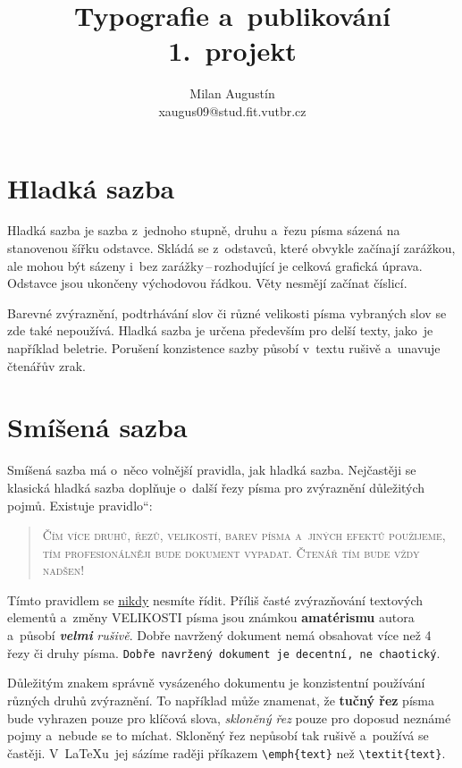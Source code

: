 \documentclass[a4paper, 11pt, twocolumn]{article}
\title{Typografie a~publikování\\1.~projekt}
\author{Milan Augustín\\
xaugus09@stud.fit.vutbr.cz}
\date{}
\newcommand{\myuv}[1]{\quotedblbase #1\textquotedblleft}
\begin{document}
\maketitle
\section{Hladká sazba}
Hladká sazba je sazba z~jednoho stupně, druhu a~řezu písma sázená na stanovenou šířku odstavce. Skládá se z~odstavců, které obvykle začínají zarážkou, ale mohou být sázeny i~bez zarážky\,--\,rozhodující je celková grafická úprava. Odstavce jsou ukončeny východovou řádkou. Věty nesmějí začínat číslicí.

Barevné zvýraznění, podtrhávání slov či různé velikosti písma vybraných slov se zde také nepoužívá. Hladká sazba je určena především pro delší texty, jako~je například beletrie. Porušení konzistence sazby pů\-so\-bí v~textu rušivě a~unavuje čtenářův zrak.

\section{Smíšená sazba}
Smíšená sazba má o~něco volnější pravidla, jak hladká sazba. Nejčastěji se klasická hladká sazba doplňuje o~další řezy písma pro zvýraznění důležitých pojmů. Existuje \myuv{pravidlo}:

\begin{quotation}
\textsc{Čím více druhů, řezů, velikostí, barev písma a~jiných efektů po\-u\-ži\-je\-me, tím profesionálněji bude do\-ku\-ment vypadat. Čtenář tím bude vždy nadšen!}
\end{quotation}

Tímto pravidlem se \underline{nikdy} nesmíte řídit. Příliš časté zvýrazňování textových elementů a~změny {\huge V}{\LARGE E}{\Large L}{\large I}{\normalsize K}{\small O}{\footnotesize S}{\scriptsize T}{\tiny I} písma {\Large jsou} {\LARGE známkou} \textbf{\huge amatérismu} autora a~působí \textbf{\itshape velmi} \emph{rušivě}. Dobře navržený dokument nemá obsahovat více než 4 řezy či druhy písma. \texttt{Dobře navržený dokument je decentní, ne chaotický}.

Důležitým znakem správně vysázeného dokumentu je konzistentní používání různých druhů zvýraznění. To například může znamenat, že \textbf{tučný řez} písma bude vyhrazen pouze pro klíčová slova, \emph{skloněný řez} pouze pro doposud neznámé pojmy a~nebude se to míchat. Skloněný řez nepůsobí tak rušivě a~používá se častěji. V~\LaTeX u~jej sázíme raději příkazem \verb|\emph{text}| než \verb|\textit{text}|.
\end{document}
